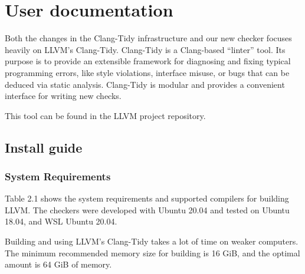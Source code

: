 
\chapter{User documentation}
\label{ch:user}

Both the changes in the Clang-Tidy infrastructure and our new checker focuses heavily on LLVM's Clang-Tidy.
Clang-Tidy is a Clang-based \CC{} “linter” tool. Its purpose is to provide an extensible framework for diagnosing and fixing
typical programming errors, like style violations, interface misuse, or bugs that can be deduced via static analysis.
Clang-Tidy is modular and provides a convenient interface for writing new checks. %

This tool can be found in the LLVM project repository. %

\section{Install guide}

\subsection{System Requirements}

Table 2.1 shows the system requirements and supported compilers for building
LLVM. The checkers were developed with Ubuntu 20.04 and tested on Ubuntu 18.04, and WSL Ubuntu 20.04.

Building and using LLVM's Clang-Tidy takes a lot of time on weaker computers. The minimum recommended memory size
for building is 16 GiB, and the optimal amount is 64 GiB of memory. %

